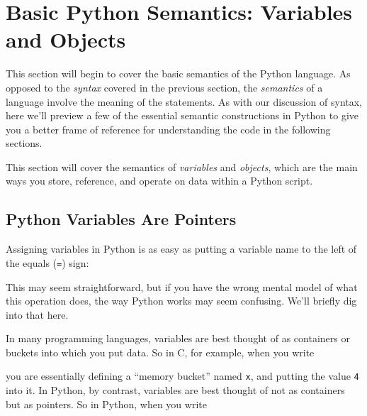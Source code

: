 \section{Basic Python Semantics: Variables and
Objects}\label{basic-python-semantics-variables-and-objects}

This section will begin to cover the basic semantics of the Python
language. As opposed to the \emph{syntax} covered in the previous
section, the \emph{semantics} of a language involve the meaning of the
statements. As with our discussion of syntax, here we'll preview a few
of the essential semantic constructions in Python to give you a better
frame of reference for understanding the code in the following sections.

This section will cover the semantics of \emph{variables} and
\emph{objects}, which are the main ways you store, reference, and
operate on data within a Python script.

\subsection{Python Variables Are
Pointers}\label{python-variables-are-pointers}

Assigning variables in Python is as easy as putting a variable name to
the left of the equals (\texttt{=}) sign:

\begin{Shaded}
\begin{Highlighting}[]
\OperatorTok{=} 
\end{Highlighting}
\end{Shaded}

This may seem straightforward, but if you have the wrong mental model of
what this operation does, the way Python works may seem confusing. We'll
briefly dig into that here.

In many programming languages, variables are best thought of as
containers or buckets into which you put data. So in C, for example,
when you write

\begin{Shaded}
\begin{Highlighting}[]
 \NormalTok{;}
\end{Highlighting}
\end{Shaded}

you are essentially defining a ``memory bucket'' named \texttt{x}, and
putting the value \texttt{4} into it. In Python, by contrast, variables
are best thought of not as containers but as pointers. So in Python,
when you write


